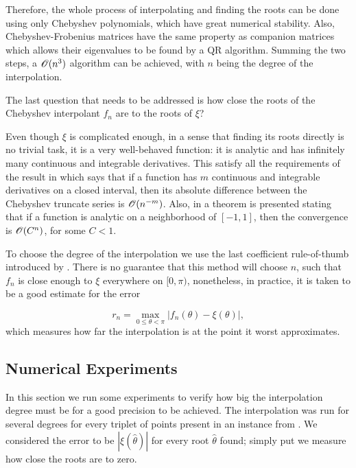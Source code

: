 Therefore, the whole process of interpolating and finding the roots can be done using only Chebyshev polynomials, which have great numerical stability. Also, Chebyshev-Frobenius matrices have the same property as companion matrices which allows their eigenvalues to be found by a QR algorithm. Summing the two steps, a $\mathscr{O}(n^3)$ algorithm can be achieved, with $n$ being the degree of the interpolation.

The last question that needs to be addressed is how close the roots of the Chebyshev interpolant $f_n$ are to the roots of $\xi$?

Even though $\xi$ is complicated enough, in a sense that finding its roots directly is no trivial task, it is a very well-behaved function: it is analytic and  has infinitely many continuous and integrable derivatives. This satisfy all the requirements of the result in  which says that if a function has $m$ continuous and integrable derivatives on a closed interval, then its absolute difference between the Chebyshev truncate series is $\mathscr{O}(n^{-m})$. Also, in  a theorem is presented stating that if a function is analytic on a neighborhood of $[-1, 1]$, then the convergence is $\mathscr{O}(C^n)$, for some $C<1$.

To choose the degree of the interpolation we use the last coefficient rule-of-thumb introduced by . There is no guarantee that this method will choose $n$, such that $f_n$ is close enough to $\xi$ everywhere on $[0, \pi)$, nonetheless, in practice, it is taken to be a good estimate for the error

\begin{equation}
r_n = \max_{0 \le \theta < \pi} |f_n(\theta) - \xi(\theta)|,
\end{equation}
which measures how far the interpolation is at the point it worst approximates. 

\subsection{Numerical Experiments}

In this section we run some experiments to verify how big the interpolation degree must be for a good precision to be achieved. 
The interpolation was run for several degrees for every triplet of points present in an instance from . We considered the error to be $|\xi(\hat{\theta})|$ for every root $\hat{\theta}$ found; simply put we measure how close the roots are to zero.

